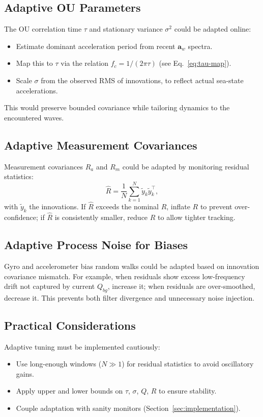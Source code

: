 \documentclass[10pt]{extarticle}
\begin{document}
\subsection{Adaptive OU Parameters}
The OU correlation time $\tau$ and stationary variance $\sigma^2$ could be adapted online:
\begin{itemize}
\item Estimate dominant acceleration period from recent $\bm a_w$ spectra.
\item Map this to $\tau$ via the relation $f_c = 1/(2\pi\tau)$ (see Eq.~\ref{eq:tau-map}).
\item Scale $\sigma$ from the observed RMS of innovations, to reflect actual sea-state accelerations.
\end{itemize}
This would preserve bounded covariance while tailoring dynamics to the encountered waves.

\subsection{Adaptive Measurement Covariances}
Measurement covariances $R_a$ and $R_m$ could be adapted by monitoring residual statistics:
\begin{equation}
\hat R = \frac{1}{N}\sum_{k=1}^N \tilde y_k \tilde y_k^\top,
\end{equation}
with $\tilde y_k$ the innovations. If $\hat R$ exceeds the nominal $R$, inflate $R$ to
prevent over-confidence; if $\hat R$ is consistently smaller, reduce $R$ to allow tighter tracking.

\subsection{Adaptive Process Noise for Biases}
Gyro and accelerometer bias random walks could be adapted based on innovation covariance mismatch.
For example, when residuals show excess low-frequency drift not captured by current $Q_{bg}$,
increase it; when residuals are over-smoothed, decrease it. This prevents both filter divergence
and unnecessary noise injection.

\subsection{Practical Considerations}
Adaptive tuning must be implemented cautiously:
\begin{itemize}
\item Use long-enough windows ($N\gg 1$) for residual statistics to avoid oscillatory gains.
\item Apply upper and lower bounds on $\tau$, $\sigma$, $Q$, $R$ to ensure stability.
\item Couple adaptation with sanity monitors (Section~\ref{sec:implementation}).
\end{itemize}
\end{document}
